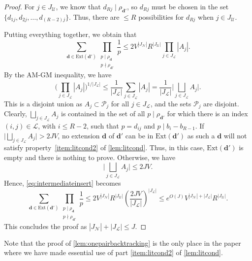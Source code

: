 \documentclass[11pt]{amsart}
\theoremstyle{definition}
\renewcommand{\leq}{\leqslant}
\newcommand{\abs}[1]{\left|#1\right|}
\newcommand{\primes}{\mathcal{P}}
\renewcommand{\d}{\boldsymbol{d}}
\newcommand{\pcomp}[2]{d_{#1#2}}
\newcommand{\curlyL}{V}
\newcommand{\sommespart}{b}
\newcommand{\fprod}[1]{\rho_{#1}}
\newcommand{\pall}{\fprod{\d}}
\newcommand{\pallprime}{\fprod{\d'}}
\newcommand{\ext}{\mathrm{Ext}}
\newcommand{\lit}{\mathcal{L}}
\newcommand{\unlit}{\mathcal{U}}
\newcommand{\new}{\mathcal{N}}
\newcommand{\repR}{J}
\newcommand{\tupsize}{R}
\begin{document}
\begin{proof}
For $j\in J_{\unlit}$, we know that $\pcomp{\tupsize}{j} \mid \pallprime$, so $\pcomp{\tupsize}{j}$ must be chosen in the set $\{\pcomp{1}{j}, \pcomp{2}{j}, \ldots, \pcomp{(\tupsize-2)}{j}\}$. Thus, there are $\leq \tupsize$ possibilities for $\pcomp{\tupsize}{j}$ when $j\in J_{\unlit}$.

Putting everything together, we obtain that 
\begin{equation}
\label{eq:intermediateinsert}
	\sum_{\d \in \ext(\d')}  \prod_{\substack{p\mid \pall\\ p\nmid \pallprime}} \frac{1}{p} \leq 2 \curlyL^{\abs{J_{\new}}}R^{\abs{J_{\unlit}}} \prod_{j\in J_{\lit}} \abs{A_j}.
\end{equation}
By the AM-GM inequality, we have
\begin{equation*}
	\bigg(\prod_{j\in J_{\lit}} \abs{A_j}\bigg)^{1/\abs{J_{\lit}}} \leq \frac{1}{\abs{J_{\lit}}} \sum_{j\in J_{\lit}} \abs{A_j} = \frac{1}{\abs{J_{\lit}}} \bigg\lvert\bigsqcup_{j\in J_{\lit}} A_j\bigg\rvert.
\end{equation*}
This is a disjoint union as $A_j \subset \primes_j$ for all $j\in J_{\lit}$, and the sets $\primes_j$ are disjoint. Clearly, $\bigsqcup_{j\in J_{\lit}} A_j$ is contained in the set of all $p\mid \pallprime$ for which there is an index $(i,j)\in \lit$, with $i\leq \tupsize-2$, such that $p = \pcomp{i}{j}$ and $p\mid \sommespart_i - \sommespart_{\tupsize-1}$. If~$\big\lvert{\bigsqcup_{j\in J_{\lit}} A_j} \big\rvert> 2\repR \curlyL$, no extension $\d$ of $\d'$ can be in $\ext(\d')$ as such a $\d$ will not satisfy property~\cref{item:litcond2} of \cref{lem:litcond}. Thus, in this case, $\ext(\d')$ is empty and there is nothing to prove. Otherwise, we have 
\begin{equation*}
	\bigg\lvert\bigsqcup_{j\in J_{\lit}} A_j\bigg\rvert \leq 2\repR\curlyL.
\end{equation*}
Hence, \cref{eq:intermediateinsert} becomes
\begin{equation*}
	\sum_{\d \in \ext(\d')}  \prod_{\substack{p\mid \pall\\ p\nmid \pallprime}} \frac{1}{p} \leq 2\curlyL^{\abs{J_{\new}}}R^{\abs{J_{\unlit}}} \left( \frac{2\repR \curlyL}{\abs{J_{\lit}}}\right)^{\abs{J_{\lit}}} \leq e^{O(\repR)} \curlyL^{\abs{J_{\new}} + \abs{J_{\lit}}} R^{\abs{J_{\unlit}}}.
\end{equation*}
This concludes the proof as $\abs{J_{\new}} + \abs{J_{\lit}} \leq \repR$.
\end{proof}

Note that the proof of \cref{lem:onepairbacktracking} is the only place in the paper where we have made essential use of part \cref{item:litcond2} of \cref{lem:litcond}.
\end{document}
